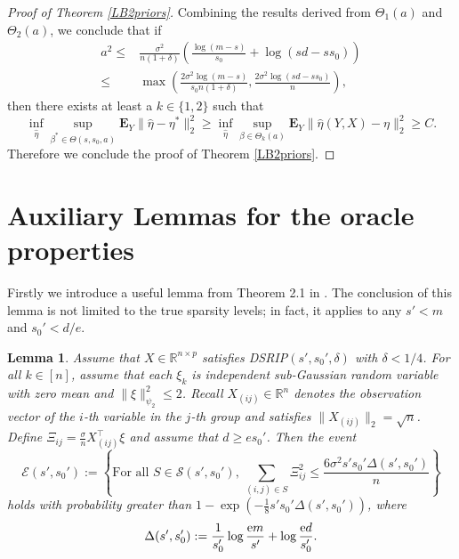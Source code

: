 \documentclass[12pt]{article}
\newtheorem{lemma}{Lemma}
\newtheorem{proof}{Proof}
\begin{document}
\begin{appendix}
\begin{proof}[Proof of Theorem \ref{LB2priors}]
Combining the results derived from ${\Theta}_1(a)$ and ${\Theta}_2(a)$, we conclude that if
\begin{align*}
a^2 \le& \frac{\sigma^2}{n(1+\delta)} \left( \frac{\log(m-s)}{s_0} + \log(sd-ss_0)\right)\\
\le& \max\left(\frac{2\sigma^2\log(m-s)}{s_0n(1+\delta)} , \frac{2\sigma^2\log(sd-ss_0)}{n} \right),
\end{align*}
then there exists at least a $k \in \{1,2\}$ such that
$$
\inf_{\hat \eta} \sup_{\beta^* \in {\Theta}(s,s_0,a)} \mathbf{E}_{Y} \| \hat \eta - \eta^* \|_2^2 
   \ge \inf_{\hat \eta} \sup_{\beta \in {\Theta}_k(a)} \mathbf{E}_{Y} \| \hat \eta(Y,X) - \eta \|_2^2 
   \ge C.
$$
Therefore we conclude the proof of Theorem \ref{LB2priors}.
\end{proof}

\clearpage
\section{Auxiliary Lemmas for the oracle properties}\label{appC}
Firstly we introduce a useful lemma from Theorem 2.1 in \cite{HK12}.
The conclusion of this lemma is not limited to the true sparsity levels; in fact, it applies to any $s' < m $ and $s_0' < d/e$. 
\begin{lemma}\label{good event}
Assume that $X\in \mathbb R^{n \times p}$ satisfies DSRIP$( s',s_0', \delta )$ with $\delta < 1/4$.
For all $ k \in [n]$, assume that each $\xi_k$ is independent sub-Gaussian random variable with zero mean and $\|\xi\|_{\psi_2}^2 \le 2$. 
Recall $X_{(ij)}\in \mathbb R^n$ denotes the observation vector of the $i$-th variable in the $j$-th group and satisfies $\|X_{(ij)}\|_2 = \sqrt n$.
Define $\Xi_{ij} = \frac\sigma n X_{(ij)}^\top \xi$ and assume that $d \ge e s_0'$.
Then the event
\begin{equation}
   \mathcal E(s',s_0'):= \left\{ \text{For all }S \in \mathcal S(s',s_0'),~\sum_{(i,j) \in S} \Xi_{ij}^2\le \frac{6 \sigma^2s's_0'\Delta(s',s_0')}n \right\}
\end{equation}
holds with probability greater than $1-\exp\left(-\frac18 s's_0'\Delta(s',s_0')\right)$, where
\begin{equation*}
    \Delta(s',s_0') := \frac1{s_0'} \log \frac{{\rm e} m}{s'} + \log \frac{{\rm e} d}{s_0'}.
\end{equation*}
\end{lemma}


\end{appendix}
\end{document}

